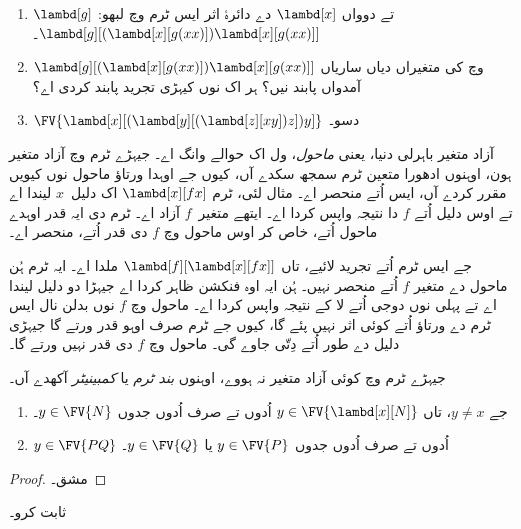 \documentclass[../../../include/open-logic-section]{subfiles}
\begin{document}
\begin{prob}
\begin{enumerate}
  \item $\lambd[g]$ تے دوواں $\lambd[x]$ دے دائرۂ اثر ایس ٹرم وچ لبھو:
    $\lambd[g][(\lambd[x][g (x x)]) \lambd[x][g (x x)]]$۔
  \item $\lambd[g][(\lambd[x][g (x x)]) \lambd[x][g (x x)]]$ وچ
    کی متغیراں دیاں ساریاں آمدواں پابند نیں؟ ہر اک نوں کیہڑی تجرید
    پابند کردی اے؟
  \item $\FV{\lambd[x][(\lambd[y][(\lambd[z][x y]) z]) y]}$ دسو۔
\end{enumerate}
\end{prob}

\begin{explain}
آزاد متغیر باہرلی دنیا، یعنی \emph{ماحول}، ول اک حوالے وانگ اے۔
جیہڑے ٹرم وچ آزاد متغیر ہون، اوہنوں ادھورا متعین ٹرم سمجھ سکدے آں،
کیوں جے اوہدا ورتاؤ ماحول نوں کیویں مقرر کردے آں، ایس اُتے منحصر اے۔
مثال لئی، ٹرم $\lambd[x][f x]$ اک دلیل~$x$ لیندا اے تے اوس دلیل
اُتے $f$ دا نتیجہ واپس کردا اے۔ ایتھے متغیر~$f$ آزاد اے۔ ٹرم دی
ایہ قدر اوہدے ماحول اُتے، خاص کر اوس ماحول وچ $f$ دی قدر اُتے،
منحصر اے۔

جے ایس ٹرم اُتے تجرید لائیے، تاں $\lambd[f][\lambd[x][f
    x]]$ ملدا اے۔ ایہ ٹرم ہُن ماحول دے متغیر $f$ اُتے منحصر نہیں۔
ہُن ایہ اوہ فنکشن ظاہر کردا اے جیہڑا دو دلیل لیندا اے تے پہلی
نوں دوجی اُتے لا کے نتیجہ واپس کردا اے۔ ماحول وچ $f$ نوں بدلن
نال ایس ٹرم دے ورتاؤ اُتے کوئی اثر نہیں پئے گا، کیوں جے ٹرم
صرف اوہو قدر ورتے گا جیہڑی دلیل دے طور اُتے دِتّی جاوے گی۔
ماحول وچ $f$ دی قدر نہیں ورتے گا۔
\end{explain}

\begin{defn}
جیہڑے ٹرم وچ کوئی آزاد متغیر نہ ہووے، اوہنوں \emph{بند ٹرم}
یا \emph{کمبینیٹر} آکھدے آں۔
\end{defn}

\begin{lem}
\begin{enumerate}
  \item {} جے $y \neq x$، تاں $y \in
    \FV{\lambd[x][N]}$ اُدوں تے صرف اُدوں جدوں $y \in \FV{N}$۔
  \item {} $y \in \FV{PQ}$ اُدوں تے صرف اُدوں
    جدوں $y \in \FV{P}$ یا $y \in \FV{Q}$۔
\end{enumerate}
\end{lem}

\begin{proof}
مشق۔
\end{proof}

\begin{prob}
 ثابت کرو۔
\end{prob}
\end{document}
